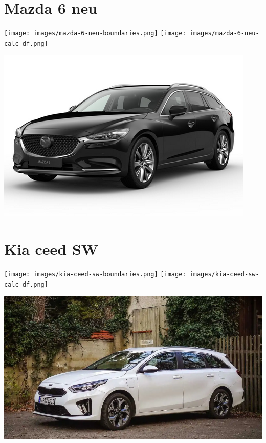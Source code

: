 \documentclass[landscape, DIV=99]{scrartcl}
\begin{document}
\pagebreak


\twocolumn

\section*{Mazda 6 neu}
\begin{center}
\texttt{[image: images/mazda-6-neu-boundaries.png]}
\null
\vspace{0.5cm}
\texttt{[image: images/mazda-6-neu-calc\_df.png]}
\end{center}

\pagebreak
\null
\vspace{2cm}
\begin{center}
\includegraphics[width=0.9\columnwidth]{cars/mazda-6-neu.png}
\end{center}

\pagebreak


\twocolumn

\section*{Kia ceed SW}
\begin{center}
\texttt{[image: images/kia-ceed-sw-boundaries.png]}
\null
\vspace{0.5cm}
\texttt{[image: images/kia-ceed-sw-calc\_df.png]}
\end{center}

\pagebreak
\null
\vspace{2cm}
\begin{center}
\includegraphics[width=0.9\columnwidth]{cars/kia-ceed-sportswagon.png}
\end{center}
\end{document}
